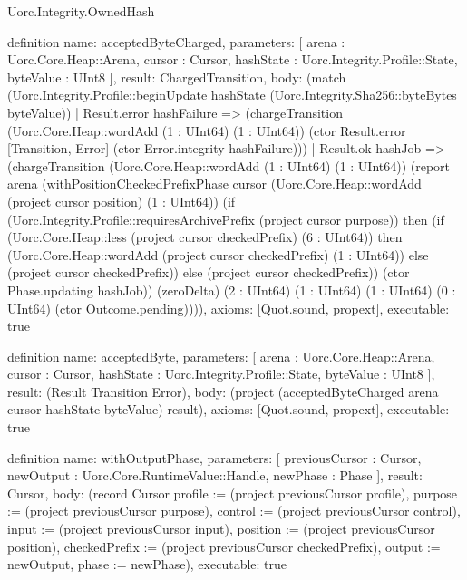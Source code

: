 \begin{lexlean}{Uorc.Integrity.OwnedHash}
\begin{semanticmodule}
definition{
  name: acceptedByteCharged,
  parameters: [
    arena : Uorc.Core.Heap::Arena,
    cursor : Cursor,
    hashState : Uorc.Integrity.Profile::State,
    byteValue : UInt8
  ],
  result: ChargedTransition,
  body: (match (Uorc.Integrity.Profile::beginUpdate hashState (Uorc.Integrity.Sha256::byteBytes byteValue))
    | Result.error hashFailure => (chargeTransition (Uorc.Core.Heap::wordAdd (1 : UInt64) (1 : UInt64)) (ctor Result.error [Transition, Error] (ctor Error.integrity hashFailure)))
    | Result.ok hashJob => (chargeTransition (Uorc.Core.Heap::wordAdd (1 : UInt64) (1 : UInt64)) (report arena (withPositionCheckedPrefixPhase cursor (Uorc.Core.Heap::wordAdd (project cursor position) (1 : UInt64)) (if (Uorc.Integrity.Profile::requiresArchivePrefix (project cursor purpose)) then (if (Uorc.Core.Heap::less (project cursor checkedPrefix) (6 : UInt64)) then (Uorc.Core.Heap::wordAdd (project cursor checkedPrefix) (1 : UInt64)) else (project cursor checkedPrefix)) else (project cursor checkedPrefix)) (ctor Phase.updating hashJob)) (zeroDelta) (2 : UInt64) (1 : UInt64) (1 : UInt64) (0 : UInt64) (ctor Outcome.pending)))),
  axioms: [Quot.sound, propext],
  executable: true
}

definition{
  name: acceptedByte,
  parameters: [
    arena : Uorc.Core.Heap::Arena,
    cursor : Cursor,
    hashState : Uorc.Integrity.Profile::State,
    byteValue : UInt8
  ],
  result: (Result Transition Error),
  body: (project (acceptedByteCharged arena cursor hashState byteValue) result),
  axioms: [Quot.sound, propext],
  executable: true
}

definition{
  name: withOutputPhase,
  parameters: [
    previousCursor : Cursor,
    newOutput : Uorc.Core.RuntimeValue::Handle,
    newPhase : Phase
  ],
  result: Cursor,
  body: (record Cursor {profile := (project previousCursor profile), purpose := (project previousCursor purpose), control := (project previousCursor control), input := (project previousCursor input), position := (project previousCursor position), checkedPrefix := (project previousCursor checkedPrefix), output := newOutput, phase := newPhase}),
  executable: true
}


\end{semanticmodule}
\end{lexlean}
